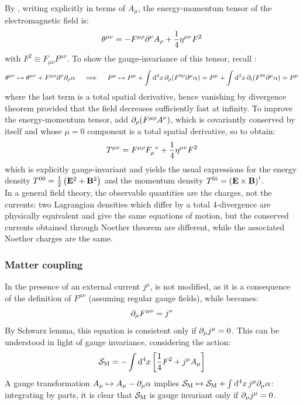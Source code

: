 By , writing  explicitly in terms of $ A_\mu $, the energy-momentum tensor of the electromagnetic field is:
\begin{equation}
  \theta^{\mu \nu} = - F^{\mu \rho} \partial^\nu A_\rho + \frac{1}{4} \eta^{\mu \nu} F^2
\end{equation}
with $ F^2 \equiv F_{\mu \nu} F^{\mu \nu} $. To show the gauge-invariance of this tensor, recall :
\begin{equation*}
  \theta^{\mu \nu} \mapsto \theta^{\mu \nu} + F^{\mu \rho} \partial^\nu \partial_\rho \alpha
  \quad \implies \quad
  P^\mu \mapsto P^\mu + \int \mathrm{d}^3x\, \partial_\rho (F^{0 \rho} \partial^\mu \alpha) = P^\mu + \int \mathrm{d}^3x\, \partial_i (F^{0i} \partial^\mu \alpha) = P^\mu
\end{equation*}
where the last term is a total spatial derivative, hence vanishing by divergence theorem provided that the field decreases sufficiently fast at infinity. To improve the energy-momentum tensor, add $ \partial_\rho (F^{\mu \rho} A^\nu) $, which is covariantly conserved by itself and whose $ \mu = 0 $ component is a total spatial derivative, so to obtain:
\begin{equation}
  T^{\mu \nu} = F^{\mu \rho} \tensor{F}{_\rho^\nu} + \frac{1}{4} \eta^{\mu \nu} F^2
\end{equation}
which is explicitly gauge-invariant and yields the usual expressions for the energy density $ T^{00} = \frac{1}{2} \left( \mathbf{E}^2 + \mathbf{B}^2 \right) $ and the momentum density $ T^{0i} = \left( \mathbf{E} \times \mathbf{B} \right)^i $.\\
In a general field theory, the observable quantities are the charges, not the currents: two Lagrangian densities which differ by a total 4-divergence are physically equivalent and give the same equations of motion, but the conserved currents obtained through Noether theorem are different, while the associated Noether charges are the same.

\subsubsection{Matter coupling}

In the presence of an external current $ j^\mu $,  is not modified, as it is a consequence of the definition of $ F^{\mu \nu} $ (assuming regular gauge fields), while  becomes:
\begin{equation}
  \partial_\mu F^{\mu \nu} = j^\nu
  \label{eq:maxw-3}
\end{equation}
By Schwarz lemma, this equation is consistent only if $ \partial_\mu j^\mu = 0 $. This can be understood in light of gauge invariance, considering the action:
\begin{equation}
  \mathcal{S}_\text{M} = - \int \mathrm{d}^4x \left[ \frac{1}{4} F^2 + j^\mu A_\mu \right]
\end{equation}
A gauge transformation $ A_\mu \mapsto A_\mu - \partial_\mu \alpha $ implies $ \mathcal{S}_\text{M} \mapsto \mathcal{S}_\text{M} + \int \mathrm{d}^4x\, j^\mu \partial_\mu \alpha $: integrating by parts, it is clear that $ \mathcal{S}_\text{M} $ is gauge invariant only if $ \partial_\mu j^\mu = 0 $.

